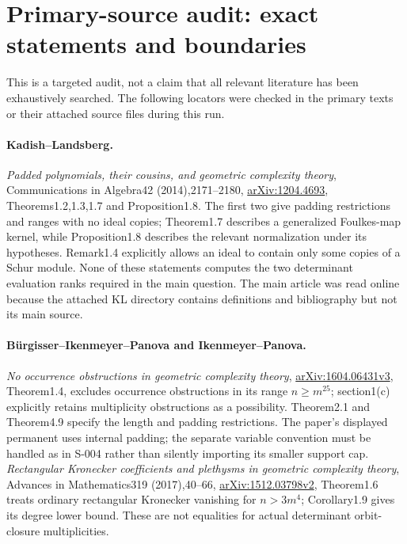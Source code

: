 \section{Primary-source audit: exact statements and boundaries}
This is a targeted audit, not a claim that all relevant literature has
been exhaustively searched. The following locators were checked in the
primary texts or their attached source files during this run.

\paragraph{Kadish--Landsberg.}
\emph{Padded polynomials, their cousins, and geometric complexity
theory}, Communications in Algebra42 (2014),2171--2180,
\href{https://arxiv.org/abs/1204.4693}{arXiv:1204.4693},
Theorems1.2,1.3,1.7 and Proposition1.8.
The first two give padding restrictions and ranges with no ideal copies;
Theorem1.7 describes a generalized Foulkes-map kernel, while
Proposition1.8 describes the relevant normalization under its hypotheses.
Remark1.4 explicitly allows an ideal to contain only some copies of a
Schur module. None of these statements computes the two determinant
evaluation ranks required in the main question. The main article was
read online because the attached KL directory contains definitions and
bibliography but not its main source.

\paragraph{B\"urgisser--Ikenmeyer--Panova and Ikenmeyer--Panova.}
\emph{No occurrence obstructions in geometric complexity theory},
\href{https://arxiv.org/abs/1604.06431}{arXiv:1604.06431v3},
Theorem1.4, excludes occurrence obstructions in its range $n\ge m^{25}$;
section1(c) explicitly retains multiplicity obstructions as a possibility.
Theorem2.1 and Theorem4.9 specify the length and padding restrictions.
The paper's displayed permanent uses internal padding; the separate
variable convention must be handled as in S-004 rather than silently
importing its smaller support cap.
\emph{Rectangular Kronecker coefficients and plethysms in geometric
complexity theory}, Advances in Mathematics319 (2017),40--66,
\href{https://arxiv.org/abs/1512.03798}{arXiv:1512.03798v2},
Theorem1.6 treats ordinary rectangular Kronecker vanishing for
$n>3m^4$; Corollary1.9 gives its degree lower bound. These are not
equalities for actual determinant orbit-closure multiplicities.

